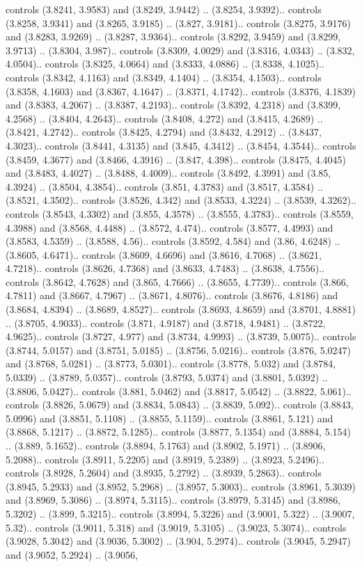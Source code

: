 controls (3.8241, 3.9583) and (3.8249, 3.9442) .. (3.8254, 3.9392).. controls (3.8258, 3.9341) and (3.8265, 3.9185) .. (3.827, 3.9181).. controls (3.8275, 3.9176) and (3.8283, 3.9269) .. (3.8287, 3.9364).. controls (3.8292, 3.9459) and (3.8299, 3.9713) .. (3.8304, 3.987).. controls (3.8309, 4.0029) and (3.8316, 4.0343) .. (3.832, 4.0504).. controls (3.8325, 4.0664) and (3.8333, 4.0886) .. (3.8338, 4.1025).. controls (3.8342, 4.1163) and (3.8349, 4.1404) .. (3.8354, 4.1503).. controls (3.8358, 4.1603) and (3.8367, 4.1647) .. (3.8371, 4.1742).. controls (3.8376, 4.1839) and (3.8383, 4.2067) .. (3.8387, 4.2193).. controls (3.8392, 4.2318) and (3.8399, 4.2568) .. (3.8404, 4.2643).. controls (3.8408, 4.272) and (3.8415, 4.2689) .. (3.8421, 4.2742).. controls (3.8425, 4.2794) and (3.8432, 4.2912) .. (3.8437, 4.3023).. controls (3.8441, 4.3135) and (3.845, 4.3412) .. (3.8454, 4.3544).. controls (3.8459, 4.3677) and (3.8466, 4.3916) .. (3.847, 4.398).. controls (3.8475, 4.4045) and (3.8483, 4.4027) .. (3.8488, 4.4009).. controls (3.8492, 4.3991) and (3.85, 4.3924) .. (3.8504, 4.3854).. controls (3.851, 4.3783) and (3.8517, 4.3584) .. (3.8521, 4.3502).. controls (3.8526, 4.342) and (3.8533, 4.3224) .. (3.8539, 4.3262).. controls (3.8543, 4.3302) and (3.855, 4.3578) .. (3.8555, 4.3783).. controls (3.8559, 4.3988) and (3.8568, 4.4488) .. (3.8572, 4.474).. controls (3.8577, 4.4993) and (3.8583, 4.5359) .. (3.8588, 4.56).. controls (3.8592, 4.584) and (3.86, 4.6248) .. (3.8605, 4.6471).. controls (3.8609, 4.6696) and (3.8616, 4.7068) .. (3.8621, 4.7218).. controls (3.8626, 4.7368) and (3.8633, 4.7483) .. (3.8638, 4.7556).. controls (3.8642, 4.7628) and (3.865, 4.7666) .. (3.8655, 4.7739).. controls (3.866, 4.7811) and (3.8667, 4.7967) .. (3.8671, 4.8076).. controls (3.8676, 4.8186) and (3.8684, 4.8394) .. (3.8689, 4.8527).. controls (3.8693, 4.8659) and (3.8701, 4.8881) .. (3.8705, 4.9033).. controls (3.871, 4.9187) and (3.8718, 4.9481) .. (3.8722, 4.9625).. controls (3.8727, 4.977) and (3.8734, 4.9993) .. (3.8739, 5.0075).. controls (3.8744, 5.0157) and (3.8751, 5.0185) .. (3.8756, 5.0216).. controls (3.876, 5.0247) and (3.8768, 5.0281) .. (3.8773, 5.0301).. controls (3.8778, 5.032) and (3.8784, 5.0339) .. (3.8789, 5.0357).. controls (3.8793, 5.0374) and (3.8801, 5.0392) .. (3.8806, 5.0427).. controls (3.881, 5.0462) and (3.8817, 5.0542) .. (3.8822, 5.061).. controls (3.8826, 5.0679) and (3.8834, 5.0843) .. (3.8839, 5.092).. controls (3.8843, 5.0996) and (3.8851, 5.1108) .. (3.8855, 5.1159).. controls (3.8861, 5.121) and (3.8868, 5.1217) .. (3.8872, 5.1285).. controls (3.8877, 5.1354) and (3.8884, 5.154) .. (3.889, 5.1652).. controls (3.8894, 5.1763) and (3.8902, 5.1971) .. (3.8906, 5.2088).. controls (3.8911, 5.2205) and (3.8919, 5.2389) .. (3.8923, 5.2496).. controls (3.8928, 5.2604) and (3.8935, 5.2792) .. (3.8939, 5.2863).. controls (3.8945, 5.2933) and (3.8952, 5.2968) .. (3.8957, 5.3003).. controls (3.8961, 5.3039) and (3.8969, 5.3086) .. (3.8974, 5.3115).. controls (3.8979, 5.3145) and (3.8986, 5.3202) .. (3.899, 5.3215).. controls (3.8994, 5.3226) and (3.9001, 5.322) .. (3.9007, 5.32).. controls (3.9011, 5.318) and (3.9019, 5.3105) .. (3.9023, 5.3074).. controls (3.9028, 5.3042) and (3.9036, 5.3002) .. (3.904, 5.2974).. controls (3.9045, 5.2947) and (3.9052, 5.2924) .. (3.9056, 